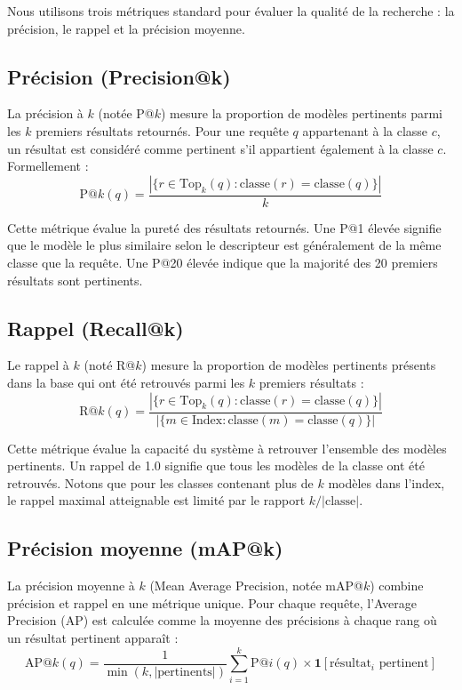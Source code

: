 \documentclass[11pt,a4paper,oneside]{report}
\begin{document}
Nous utilisons trois métriques standard pour évaluer la qualité de la recherche : la précision, le rappel et la précision moyenne.

\subsection{Précision (Precision@k)}

La précision à $k$ (notée P@$k$) mesure la proportion de modèles pertinents parmi les $k$ premiers résultats retournés. Pour une requête $q$ appartenant à la classe $c$, un résultat est considéré comme pertinent s'il appartient également à la classe $c$. Formellement :
$$\text{P@}k(q) = \frac{|\{r \in \text{Top}_k(q) : \text{classe}(r) = \text{classe}(q)\}|}{k}$$

Cette métrique évalue la pureté des résultats retournés. Une P@1 élevée signifie que le modèle le plus similaire selon le descripteur est généralement de la même classe que la requête. Une P@20 élevée indique que la majorité des 20 premiers résultats sont pertinents.

\subsection{Rappel (Recall@k)}

Le rappel à $k$ (noté R@$k$) mesure la proportion de modèles pertinents présents dans la base qui ont été retrouvés parmi les $k$ premiers résultats :
$$\text{R@}k(q) = \frac{|\{r \in \text{Top}_k(q) : \text{classe}(r) = \text{classe}(q)\}|}{|\{m \in \text{Index} : \text{classe}(m) = \text{classe}(q)\}|}$$

Cette métrique évalue la capacité du système à retrouver l'ensemble des modèles pertinents. Un rappel de 1.0 signifie que tous les modèles de la classe ont été retrouvés. Notons que pour les classes contenant plus de $k$ modèles dans l'index, le rappel maximal atteignable est limité par le rapport $k / |\text{classe}|$.

\subsection{Précision moyenne (mAP@k)}

La précision moyenne à $k$ (Mean Average Precision, notée mAP@$k$) combine précision et rappel en une métrique unique. Pour chaque requête, l'Average Precision (AP) est calculée comme la moyenne des précisions à chaque rang où un résultat pertinent apparaît :
$$\text{AP@}k(q) = \frac{1}{\min(k, |\text{pertinents}|)} \sum_{i=1}^{k} \text{P@}i(q) \times \mathbf{1}[\text{résultat}_i \text{ pertinent}]$$
\end{document}
